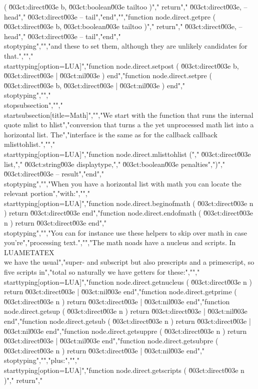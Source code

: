 ( \u003ct:direct\u003e b, \u003ct:boolean\u003e tailtoo )","    return","        \u003ct:direct\u003e, -- head","        \u003ct:direct\u003e  -- tail","end","","function node.direct.getpre ( \u003ct:direct\u003e b, \u003ct:boolean\u003e tailtoo )","    return","        \u003ct:direct\u003e, -- head","        \u003ct:direct\u003e  -- tail","end","\\stoptyping","","and these to set them, although they are unlikely candidates for that.","","\\starttyping[option=LUA]","function node.direct.setpost ( \u003ct:direct\u003e b, \u003ct:direct\u003e | \u003ct:nil\u003e ) end","function node.direct.setpre  ( \u003ct:direct\u003e b, \u003ct:direct\u003e | \u003ct:nil\u003e ) end","\\stoptyping","","\\stopsubsection","","\\startsubsection[title={Math}]","","We start with the function that runs the internal \\quote {mlist to hlist}","conversion that turns a the yet unprocessed math list into a horizontal list. The","interface is the same as for the callback callback {mlisttohlist}.","","\\starttyping[option=LUA]","function node.direct.mlisttohlist (","    \u003ct:direct\u003e  list,","    \u003ct:string\u003e  displaytype,","    \u003ct:boolean\u003e penalties",")","   \u003ct:direct\u003e -- result","end","\\stoptyping","","When you have a horizontal list with math you can locate the relevant portion","with:","","\\starttyping[option=LUA]","function node.direct.beginofmath ( \u003ct:direct\u003e n ) return \u003ct:direct\u003e end","function node.direct.endofmath   ( \u003ct:direct\u003e n ) return \u003ct:direct\u003e end","\\stoptyping","","You can for instance use these helpers to skip over math in case you're","processing text.","","The math noads have a nucleus and scripts. In \\LUAMETATEX\\ we have the usual","super- and subscript but also prescripts and a primescript, so five scripts in","total so naturally we have getters for these:","","\\starttyping[option=LUA]","function node.direct.getnucleus ( \u003ct:direct\u003e n ) return \u003ct:direct\u003e | \u003ct:nil\u003e end","function node.direct.getprime   ( \u003ct:direct\u003e n ) return \u003ct:direct\u003e | \u003ct:nil\u003e end","function node.direct.getsup     ( \u003ct:direct\u003e n ) return \u003ct:direct\u003e | \u003ct:nil\u003e end","function node.direct.getsub     ( \u003ct:direct\u003e n ) return \u003ct:direct\u003e | \u003ct:nil\u003e end","function node.direct.getsuppre  ( \u003ct:direct\u003e n ) return \u003ct:direct\u003e | \u003ct:nil\u003e end","function node.direct.getsubpre  ( \u003ct:direct\u003e n ) return \u003ct:direct\u003e | \u003ct:nil\u003e end","\\stoptyping","","plus:","","\\starttyping[option=LUA]","function node.direct.getscripts ( \u003ct:direct\u003e n )","    return","        